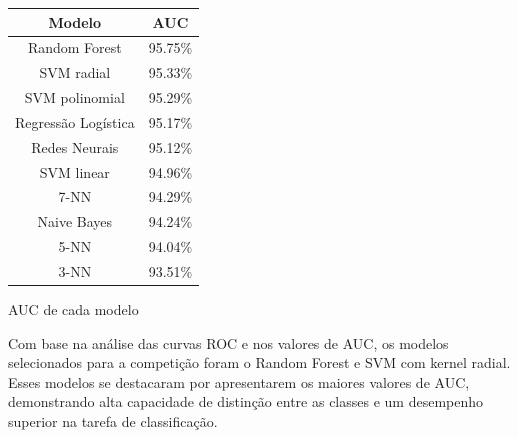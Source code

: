 \documentclass[10pt, conference, compsocconf]{IEEEtran}
\begin{document}
\vspace{0.3cm}
\begin{center}
{\scriptsize
\begin{tabular}{|c|c|}
\hline 
Modelo & AUC \\ 
\hline
Random Forest & 95.75\% \\ 
\hline
SVM radial & 95.33\% \\ 
\hline
SVM polinomial & 95.29\% \\ 
\hline
Regressão Logística & 95.17\% \\ 
\hline
Redes Neurais & 95.12\%  \\ 
\hline
SVM linear& 94.96\% \\ 
\hline
7-NN & 94.29\% \\ 
\hline
Naive Bayes & 94.24\% \\ 
\hline
5-NN & 94.04\% \\ 
\hline
3-NN & 93.51\% \\ 
\hline
\end{tabular}
}
\vspace{0.1cm}
\par {\scriptsize AUC de cada modelo}
\end{center}
\vspace{0.2cm}

Com base na análise das curvas ROC e nos valores de AUC, os modelos selecionados para a competição foram o Random Forest e SVM com kernel radial. Esses modelos se destacaram por apresentarem os maiores valores de 
AUC, demonstrando alta capacidade de distinção entre as classes e um desempenho superior na tarefa de classificação. 
\end{document}
